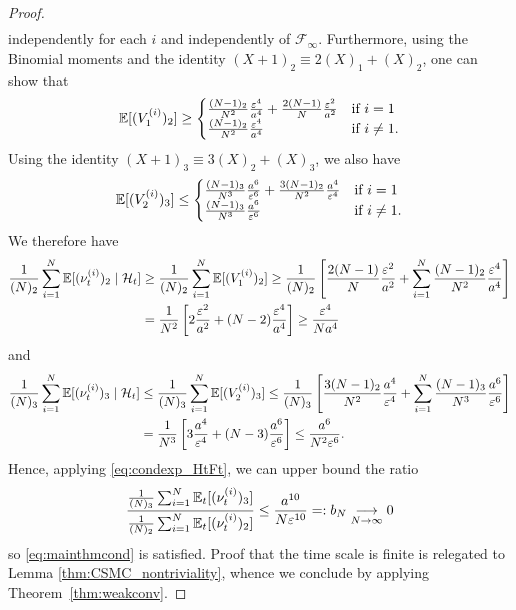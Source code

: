 \begin{proof}
\begin{align*}
\end{align*}
independently for each $i$ and independently of $\mathcal{F}_\infty$.
Furthermore, using the Binomial moments and the identity $(X+1)_2 \equiv 2(X)_1 +(X)_2$, one can show that
\begin{equation*}
\mathbb{E}[ (V_1^{(i)} )_2 ]
\geq \begin{cases}
\frac{(N-1)_2}{N^2}\frac{\varepsilon^4}{a^4} 
        + \frac{2(N-1)}{N} \frac{\varepsilon^2}{a^2} &\text{if } i=1 \\
\frac{(N-1)_2}{N^2}\frac{\varepsilon^4}{a^4} &\text{if } i\neq 1 .
\end{cases}
\end{equation*}
Using the identity $(X+1)_3 \equiv 3(X)_2 +(X)_3$, we also have
\begin{equation*}
\mathbb{E}[ (V_2^{(i)} )_3 ]
\leq \begin{cases}
\frac{(N-1)_3}{N^3}\frac{a^6}{\varepsilon^6} 
        + \frac{3(N-1)_2}{N^2} \frac{a^4}{\varepsilon^4} &\text{if } i=1 \\
\frac{(N-1)_3}{N^3}\frac{a^6}{\varepsilon^6}  &\text{if } i\neq 1 .
\end{cases}
\end{equation*}
We therefore have
\begin{align}
\frac{1}{(N)_2} \sum_{i=1}^N \mathbb{E}[ (\nu_t^{(i)})_2 \mid \mathcal{H}_t ]
&\geq \frac{1}{(N)_2} \sum_{i=1}^N \mathbb{E}[ ( V_1^{(i)} )_2 ]
\geq \frac{1}{(N)_2} \left[ \frac{2(N-1)}{N} \frac{\varepsilon^2}{a^2}
        + \sum_{i=1}^N \frac{(N-1)_2}{N^2}\frac{\varepsilon^4}{a^4} \right] \notag\\
&= \frac{1}{N^2} \left[ 2 \frac{\varepsilon^2}{a^2} 
        + (N-2) \frac{\varepsilon^4}{a^4} \right]
   \geq \frac{\varepsilon^4}{Na^4} \label{eq:csmc_cN_LB}
\end{align}
and
\begin{align*}
\frac{1}{(N)_3} \sum_{i=1}^N \mathbb{E}[ (\nu_t^{(i)})_3 \mid \mathcal{H}_t ]
&\leq \frac{1}{(N)_3} \sum_{i=1}^N \mathbb{E}[ ( V_2^{(i)} )_3 ]
\leq \frac{1}{(N)_3} \left[ \frac{3(N-1)_2}{N^2} \frac{a^4}{\varepsilon^4}
        + \sum_{i=1}^N \frac{(N-1)_3}{N^3}\frac{a^6}{\varepsilon^6}  \right] \\
&= \frac{1}{N^3} \left[ 3 \frac{a^4}{\varepsilon^4} 
        + (N-3) \frac{a^6}{\varepsilon^6} \right]
    \leq \frac{a^6}{N^2 \varepsilon^6} .
\end{align*}
Hence, applying \eqref{eq:condexp_HtFt}, we can upper bound the ratio
\begin{equation*}
\frac{\frac{1}{(N)_3} \sum_{i=1}^N \mathbb{E}_t[ (\nu_t^{(i)})_3 ]}{\frac{1}{(N)_2} 
        \sum_{i=1}^N \mathbb{E}_t[ (\nu_t^{(i)})_2 ]}
\leq \frac{a^{10}}{N\varepsilon^{10}}
=: b_N 
\underset{N\to\infty}{\longrightarrow} 0
\end{equation*}
so \eqref{eq:mainthmcond} is satisfied. 
Proof that the time scale is finite is relegated to Lemma \ref{thm:CSMC_nontriviality}, whence we conclude by applying Theorem~\ref{thm:weakconv}.


\end{proof}
